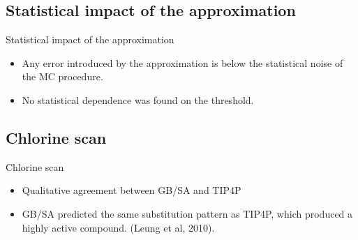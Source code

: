 \documentclass[10pt]{beamer}
\begin{document}

\subsection{Statistical impact of the approximation}


\begin{frame}[t]{Statistical impact of the approximation}

\begin{center}
\scalebox{.75}{}
\end{center}

\begin{itemize}
    \item Any error introduced by the approximation is below the statistical noise of the MC procedure. 
    \item No statistical dependence was found on the threshold.
\end{itemize}

\end{frame}


\subsection{Chlorine scan}


\begin{frame}[t]{Chlorine scan}

\begin{center}
\scalebox{.75}{}
\end{center}

\begin{itemize}
    \item Qualitative agreement between GB/SA and TIP4P
    \item GB/SA predicted the same substitution pattern as TIP4P, which produced a highly active compound. (Leung et al, 2010).
\end{itemize}
\end{frame}
\end{document}
